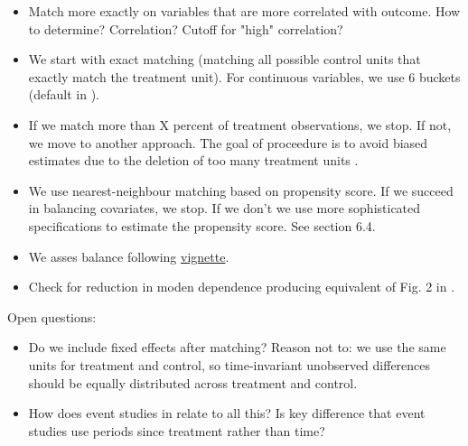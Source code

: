 \documentclass[a4paper, 11pt]{article}
\begin{document}
\begin{itemize}
\begin{itemize}
            \item Match more exactly on variables that are more correlated with
                outcome. How to determine? Correlation? Cutoff for "high"
                correlation?

            \item We start with exact matching (matching all possible control
                units that exactly match the treatment unit). For continuous
                variables, we use 6 buckets (default in
                \citet{stuart2011matchit}).

            \item If we match more than X percent of treatment observations, we
                stop. If not, we move to another approach. The goal of
                proceedure is to avoid biased estimates due to the deletion of
                too many treatment units \citep{rosenbaum1985bias}.

            \item We use nearest-neighbour matching based on propensity score.
                If we succeed in balancing covariates, we stop. If we don't we
                use more sophisticated specifications to estimate the
                propensity score. See \citet{ho2007matching} section 6.4.

            \item We asses balance following
                \href{https://kosukeimai.github.io/MatchIt/articles/assessing-balance.html}{vignette}.

            \item Check for reduction in moden dependence producing equivalent
                of Fig. 2 in \citet{ho2007matching}.

        \end{itemize}
\end{itemize}


Open questions:
\begin{itemize}
    \item Do we include fixed effects after matching? Reason not to: we use the
        same units for treatment and control, so time-invariant unobserved
        differences should be equally distributed across treatment and control.

    \item How does event studies in \citet{sun2021estimating} relate to all
        this? Is key difference that event studies use periods since treatment
        rather than time?

\end{itemize}
\end{document}
